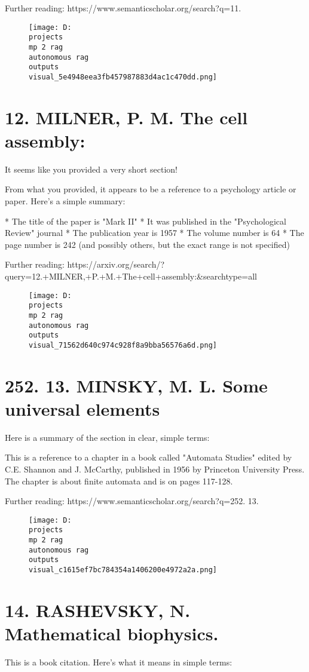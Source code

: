 \documentclass[12pt,a4paper]{article}
\begin{document}
Further reading: https://www.semanticscholar.org/search?q=11.%
\begin{figure}[h]
\centering
\texttt{[image: D:\\projects\\mp 2 rag\\autonomous rag\\outputs\\visual\_5e4948eea3fb457987883d4ac1c470dd.png]}
\end{figure}
\section{12. MILNER, P. M. The cell assembly:}
It seems like you provided a very short section!

From what you provided, it appears to be a reference to a psychology article or paper. Here's a simple summary:

* The title of the paper is "Mark II"
* It was published in the "Psychological Review" journal
* The publication year is 1957
* The volume number is 64
* The page number is 242 (and possibly others, but the exact range is not specified)

Further reading: https://arxiv.org/search/?query=12.+MILNER,+P.+M.+The+cell+assembly:&searchtype=all
\begin{figure}[h]
\centering
\texttt{[image: D:\\projects\\mp 2 rag\\autonomous rag\\outputs\\visual\_71562d640c974c928f8a9bba56576a6d.png]}
\end{figure}
\section{252.
13. MINSKY, M. L. Some universal elements}
Here is a summary of the section in clear, simple terms:

This is a reference to a chapter in a book called "Automata Studies" edited by C.E. Shannon and J. McCarthy, published in 1956 by Princeton University Press. The chapter is about finite automata and is on pages 117-128.

Further reading: https://www.semanticscholar.org/search?q=252.
13.%
\begin{figure}[h]
\centering
\texttt{[image: D:\\projects\\mp 2 rag\\autonomous rag\\outputs\\visual\_c1615ef7bc784354a1406200e4972a2a.png]}
\end{figure}
\section{14. RASHEVSKY, N. Mathematical biophysics.}
This is a book citation. Here's what it means in simple terms:
\end{document}
